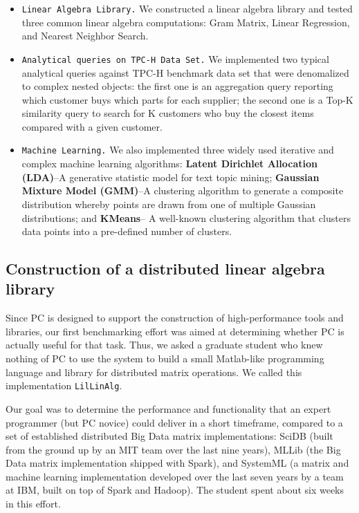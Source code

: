 \begin {itemize}
\item \texttt{Linear Algebra Library.} We constructed a linear algebra library
  and tested three common linear algebra computations: Gram Matrix,
  Linear Regression, and Nearest Neighbor Search.
\item \texttt{Analytical queries on TPC-H Data
    Set.}  We implemented two typical analytical queries against TPC-H
  benchmark data set that were denomalized to complex nested objects: the first one is an aggregation query reporting which customer buys which
  parts for each supplier; the second one is a Top-K similarity query
  to search for K customers who buy the closest items compared with a
  given customer.
\item \texttt{Machine Learning.} We also implemented three widely used
  iterative and complex machine learning algorithms: \textbf{Latent Dirichlet Allocation (LDA)}--A
  generative statistic model for text topic mining;
  \textbf{Gaussian Mixture Model (GMM)}--A clustering algorithm to generate a composite
  distribution whereby points are drawn from one of multiple Gaussian distributions;  and \textbf{KMeans}-- A well-known clustering algorithm that clusters
  data points into a pre-defined number of clusters.
\end {itemize}





\subsection {Construction of a distributed linear algebra library}
Since PC is designed to support the construction
of high-performance tools and libraries, our first benchmarking effort was aimed at determining 
whether PC is actually useful for that task.  Thus, we asked
a graduate student who knew nothing of PC to use the system to build a small Matlab-like 
programming language and library for distributed matrix operations.
We called this implementation \texttt{LilLinAlg}.

Our goal was to determine the 
performance and functionality that an expert programmer (but PC novice) could deliver in a short
timeframe, compared to a set of established distributed Big Data matrix implementations:
SciDB \cite{brown2010overview, stonebraker2011architecture} (built from the ground up by an MIT team over the last nine years), MLLib \cite{meng2016mllib} 
(the Big Data matrix
implementation shipped with Spark), and SystemML \cite{boehm2014hybrid, ghoting2011systemml, boehm2016systemml}
(a matrix and machine learning implementation developed
over the last seven years by a team at IBM, built on top of Spark and Hadoop).
The student spent about six weeks in this effort.

